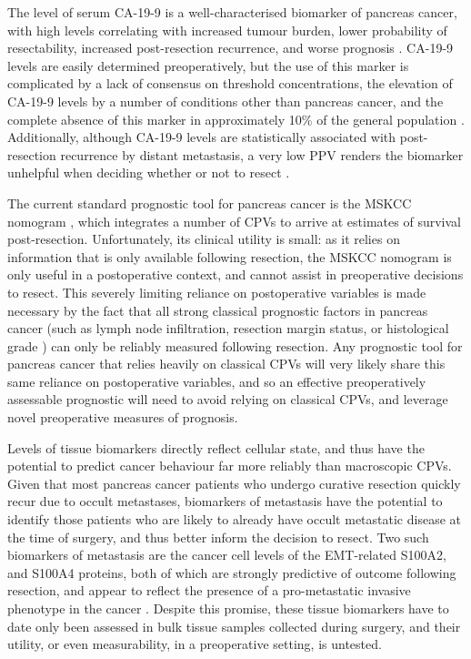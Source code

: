 \documentclass[dissertation.tex]{subfiles}
\begin{document}
The level of serum \gls{CA-19-9} is a well-characterised biomarker of pancreas cancer, with high levels correlating with increased tumour burden, lower probability of resectability, increased post-resection recurrence, and worse prognosis \cite{Kim2011, Ballehaninna2012, Barugola2007, Lundin1994}.  \Gls{CA-19-9} levels are easily determined preoperatively, but the use of this marker is complicated by a lack of consensus on threshold concentrations, the elevation of \gls{CA-19-9} levels by a number of conditions other than pancreas cancer, and the complete absence of this marker in approximately 10\% of the general population \cite{Ballehaninna2012}.  Additionally, although \gls{CA-19-9} levels are statistically associated with post-resection recurrence by distant metastasis, a very low \gls{PPV} renders the biomarker unhelpful when deciding whether or not to resect \cite{Kim2011}.

The current standard prognostic tool for pancreas cancer is the \gls{MSKCC} nomogram \cite{Brennan2004}, which integrates a number of \glspl{CPV} to arrive at estimates of survival post-resection.  Unfortunately, its clinical utility is small: as it relies on information that is only available following resection, the \gls{MSKCC} nomogram is only useful in a postoperative context, and cannot assist in preoperative decisions to resect.  This severely limiting reliance on postoperative variables is made necessary by the fact that all strong classical prognostic factors in pancreas cancer (such as lymph node infiltration, resection margin status, or histological grade \cite{Bilici2014}) can only be reliably measured following resection.  Any prognostic tool for pancreas cancer that relies heavily on classical \glspl{CPV} will very likely share this same reliance on postoperative variables, and so an effective preoperatively assessable prognostic will need to avoid relying on classical \glspl{CPV}, and leverage novel preoperative measures of prognosis.

Levels of tissue biomarkers directly reflect cellular state, and thus have the potential to predict cancer behaviour far more reliably than macroscopic \glspl{CPV}.  Given that most pancreas cancer patients who undergo curative resection quickly recur due to occult metastases, biomarkers of metastasis have the potential to identify those patients who are likely to already have occult metastatic disease at the time of surgery, and thus better inform the decision to resect.  Two such biomarkers of metastasis are the cancer cell levels of the \gls{EMT}-related S100A2, and S100A4 proteins, both of which are strongly predictive of outcome following resection, and appear to reflect the presence of a pro-metastatic invasive phenotype in the cancer \cite{Biankin2009, Tsukamoto2013, Lee2014}.  Despite this promise, these tissue biomarkers have to date only been assessed in bulk tissue samples collected during surgery, and their utility, or even measurability, in a preoperative setting, is untested.
\end{document}
